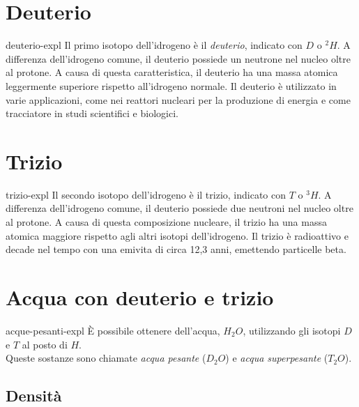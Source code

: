 \documentclass[preview]{standalone}
\begin{document}
\genpage

\section{Deuterio}

\begin{snippet}{deuterio-expl}
Il primo isotopo dell'idrogeno è il \textit{deuterio}, indicato con \(D\) o \(^2H\).
A differenza dell'idrogeno comune, il deuterio possiede un neutrone nel nucleo oltre al protone.
A causa di questa caratteristica, il deuterio ha una massa atomica leggermente superiore rispetto all'idrogeno normale.
Il deuterio è utilizzato in varie applicazioni, come nei reattori nucleari per la produzione di energia e come tracciatore in studi scientifici e biologici. 
\end{snippet}

\section{Trizio}

\begin{snippet}{trizio-expl}
Il secondo isotopo dell'idrogeno è il trizio, indicato con \(T\) o \(^3H\).
A differenza dell'idrogeno comune, il deuterio possiede due neutroni nel nucleo oltre al protone.
A causa di questa composizione nucleare, il trizio ha una massa atomica maggiore rispetto agli altri isotopi dell'idrogeno.
Il trizio è radioattivo e decade nel tempo con una emivita di circa 12,3 anni, emettendo particelle beta.
\end{snippet}

\section{Acqua con deuterio e trizio}

\begin{snippet}{acque-pesanti-expl}
È possibile ottenere dell'acqua, \(H_2O\), utilizzando gli isotopi \(D\) e \(T\) al posto di \(H\).
\\
Queste sostanze sono chiamate \textit{acqua pesante} (\(D_2O\)) e
\textit{acqua superpesante} (\(T_2O\)).
\end{snippet}

\subsection{Densità}
\end{document}
